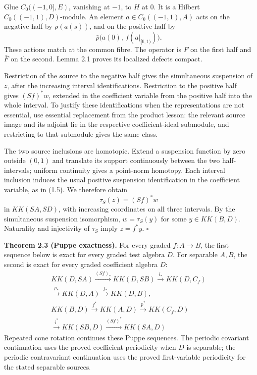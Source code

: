 \documentclass[
  11pt,
]{article}
\begin{document}
Glue \(C_0((-1,0],E)\), vanishing at \(-1\), to \(H\) at 0. It is a
Hilbert \(C_0((-1,1),D)\)-module. An element \(a\in C_0((-1,1),A)\) acts
on the negative half by \(\rho(a(s))\), and on the positive half by \[
\bar\rho\bigl(a(0),\,f(a|_{[0,1)})\bigr).
\tag{2.5}
\] These actions match at the common fibre. The operator is \(F\) on the
first half and \(\bar F\) on the second. Lemma 2.1 proves its localized
defects compact.

Restriction of the source to the negative half gives the simultaneous
suspension of \(z\), after the increasing interval identifications.
Restriction to the positive half gives \((Sf)^*w\), extended in the
coefficient variable from the positive half into the whole interval. To
justify these identifications when the representations are not
essential, use essential replacement from the product lesson: the
relevant source image and its adjoint lie in the respective
coefficient-ideal submodule, and restricting to that submodule gives the
same class.

The two source inclusions are homotopic. Extend a suspension function by
zero outside \((0,1)\) and translate its support continuously between
the two half-intervals; uniform continuity gives a point-norm homotopy.
Each interval inclusion induces the usual positive suspension
identification in the coefficient variable, as in (1.5). We therefore
obtain \[
\tau_S(z)=(Sf)^*w
\tag{2.6}
\] in \(KK(SA,SD)\), with increasing coordinates on all three intervals.
By the simultaneous suspension isomorphism, \(w=\tau_S(y)\) for some
\(y\in KK(B,D)\). Naturality and injectivity of \(\tau_S\) imply
\(z=f^*y\). \(\square\)

\textbf{Theorem 2.3 (Puppe exactness).} For every graded \(f:A\to B\),
the first sequence below is exact for every graded test algebra \(D\).
For separable \(A,B\), the second is exact for every graded coefficient
algebra \(D\): \[
\begin{gathered}
KK(D,SA)\xrightarrow{(Sf)_*}KK(D,SB)
\xrightarrow{i_*}KK(D,C_f)\\
\xrightarrow{p_*}KK(D,A)\xrightarrow{f_*}KK(D,B),\\[2pt]
KK(B,D)\xrightarrow{f^*}KK(A,D)
\xrightarrow{p^*}KK(C_f,D)\\
\xrightarrow{i^*}KK(SB,D)
\xrightarrow{(Sf)^*}KK(SA,D)
\end{gathered}
\tag{2.7}
\] Repeated cone rotation continues these Puppe sequences. The periodic
covariant continuation uses the proved coefficient periodicity when
\(D\) is separable; the periodic contravariant continuation uses the
proved first-variable periodicity for the stated separable sources.
\end{document}
